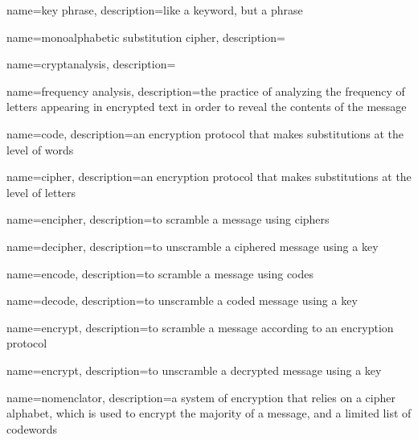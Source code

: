 {
    name={key phrase},
    description={like a keyword, but a phrase}
}

{
    name={monoalphabetic substitution cipher},
    description={ }
}

{
    name={cryptanalysis},
    description={ }
}

{
    name={frequency analysis},
    description={the practice of analyzing the frequency of letters appearing in encrypted text in order to reveal the contents of the message}
}

{
    name={code},
    description={an encryption protocol that makes substitutions at the level of words}
}

{
    name={cipher},
    description={an encryption protocol that makes substitutions at the level of letters}
}

{
    name={encipher},
    description={to scramble a message using ciphers}
}

{
    name={decipher},
    description={to unscramble a ciphered message using a key}
}

{
    name={encode},
    description={to scramble a message using codes}
}

{
    name={decode},
    description={to unscramble a coded message using a key}
}

{
    name={encrypt},
    description={to scramble a message according to an encryption protocol}
}

{
    name={encrypt},
    description={to unscramble a decrypted message using a key}
}

{
    name={nomenclator},
    description={a system of encryption that relies on a cipher alphabet, which is used to encrypt the majority of a message, and a limited list of codewords}
}





